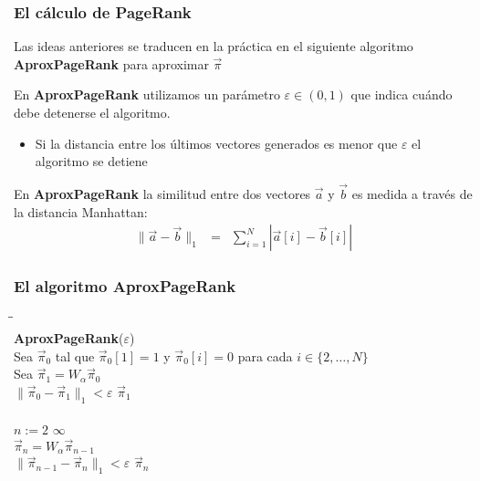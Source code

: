 \begin{frame}
\frametitle{El cálculo de PageRank}

{\footnotesize

Las ideas anteriores se traducen en la práctica en el siguiente algoritmo {\bf AproxPageRank} para aproximar $\vec \pi$


En {\bf AproxPageRank} utilizamos un parámetro $\varepsilon \in (0,1)$ que indica cuándo debe detenerse el algoritmo.
\begin{itemize}
\item Si la distancia entre los últimos vectores generados es menor que $\varepsilon$ el algoritmo se detiene
\end{itemize}


En {\bf AproxPageRank} la similitud entre dos vectores $\vec a$ y $\vec b$ es medida a través de la distancia Manhattan:
\begin{eqnarray*}
\|\vec a - \vec b\|_1 &=& \sum_{i=1}^N |\vec a[i] - \vec b[i]|
\end{eqnarray*}

}



\end{frame}


\begin{frame}
\frametitle{El algoritmo {\bf AproxPageRank}}

{\footnotesize

\begin{tabbing}
\phantom{MM}\=\phantom{MM}\=\phantom{MM}\=\\
{\bf AproxPageRank}($\varepsilon$)\\
\> Sea $\vec \pi_0$ tal que $\vec \pi_0[1]=1$ y $\vec \pi_0[i] = 0$ para cada $i \in \{2, \ldots, N\}$\\
\> Sea $\vec \pi_1 = W_\alpha \vec \pi_0$\\
\> \aif $\|\vec \pi_0 - \vec \pi_1\|_1 < \varepsilon$ \athen \areturn $\vec \pi_1$\\
\> \aelse\\
\> \> \afor $n := 2$ \ato $\infty$ \ado\\
\> \> \> $\vec \pi_n = W_\alpha \vec \pi_{n-1}$\\
\> \> \> \aif $\|\vec \pi_{n-1} - \vec \pi_n\|_1 < \varepsilon$ \athen \areturn $\vec \pi_n$
\end{tabbing}


}



\end{frame}


